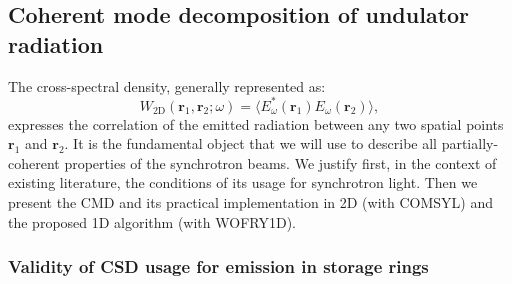 \documentclass{iucr}              %
\begin{document}
\subsection{Coherent mode decomposition of undulator radiation}\label{sec:CMD}

The cross-spectral density, generally represented as:
\begin{equation}
W_\text{2D}(\textbf{r}_1,\textbf{r}_2;\omega) = \big\langle E^*_{\omega}(\textbf{r}_1)  E_{\omega}(\textbf{r}_2)\big\rangle,
\label{eq:CSD_2D}
\end{equation}
expresses the correlation of the emitted radiation between any two spatial points $\textbf{r}_1$ and $\textbf{r}_2$. It is the fundamental object that we will use to describe all partially-coherent properties of the synchrotron beams. We justify first, in the context of existing literature, the conditions of its usage for synchrotron light. Then we present the CMD and its practical implementation in 2D (with COMSYL) and the proposed 1D algorithm (with WOFRY1D).   



\subsubsection{Validity of CSD usage for emission in storage rings\\}\label{sec:validity}
\end{document}
